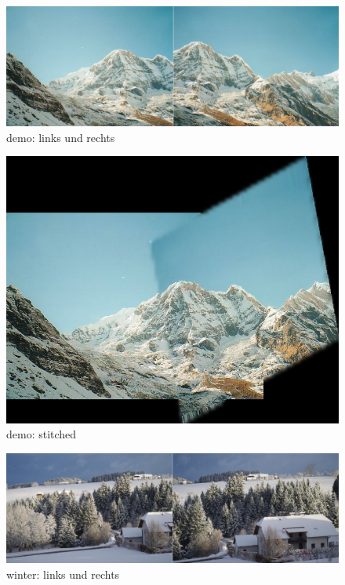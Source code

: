 \documentclass[deutsch]{scrartcl}
\begin{document}
\begin{figure}
\begin{center}
\includegraphics[width=1.0\textwidth]{demo.jpg}
\caption{demo: links und rechts}
\label{fig:demo}
\end{center}
\end{figure}

\begin{figure}
\begin{center}
\includegraphics[width=1.0\textwidth]{demoS.png}
\caption{demo: stitched}
\label{fig:demoS}
\end{center}
\end{figure}

\begin{figure}
\begin{center}
\includegraphics[width=1.0\textwidth]{winter.jpg}
\caption{winter: links und rechts}
\label{fig:winter}
\end{center}
\end{figure}
\end{document}
